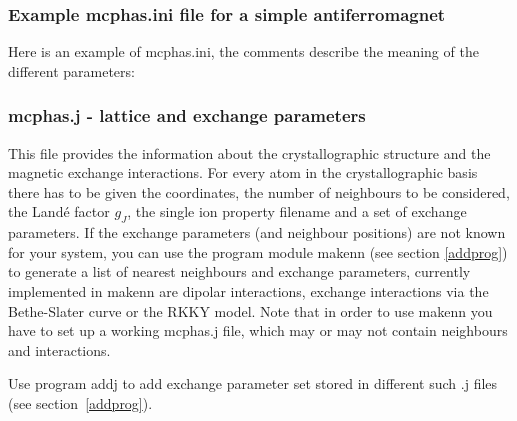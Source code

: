  
\subsubsection{Example {\prg mcphas.ini} file for a simple antiferromagnet}

Here is an example of {\prg mcphas.ini}, the comments describe the meaning of the different
parameters:





\subsubsection{{\prg mcphas.j} - lattice and exchange parameters}\label{mcphasj}
This file provides the information about 
the crystallographic
 structure and the magnetic exchange interactions.
For every atom in the crystallographic basis there
has to be given the coordinates, the number of neighbours to be considered, the 
Land\'e factor $g_J$, the single ion property filename and  a set of exchange parameters.
If the exchange parameters (and neighbour positions) are not known for your system, you 
can use the program module {\prg makenn} (see section \ref{addprog}) to generate 
a list of nearest neighbours and
exchange parameters, currently implemented in {\prg makenn} are dipolar interactions,
exchange interactions via the Bethe-Slater curve or the RKKY model. Note that in order
to use {\prg makenn} you have to set up a working {\prg mcphas.j} file, which may or
may not contain neighbours and interactions.

Use program {\prg addj} to add exchange parameter set stored in different 
such {\prg .j} files (see section~\ref{addprog}).



